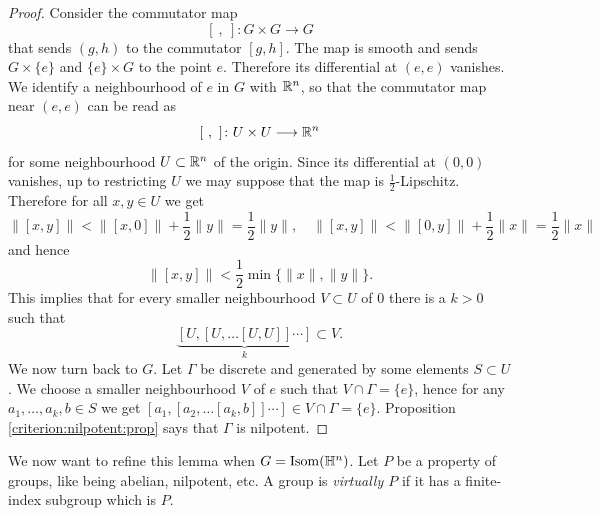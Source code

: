 \begin{proof}
Consider the commutator map 
$$[\ ,\ ]\colon G\times G \to G$$ 
that sends $(g,h)$ to the commutator $[g,h]$. The map is smooth and sends $G\times \{e\}$ and $\{e\}\times G$ to the point $e$. Therefore its differential at $(e,e)$ vanishes. We identify a neighbourhood of $e$ in $G$ with $\mathbb{R}^n$, so that the commutator map near $(e,e)$ can be read as 
$$[\ ,\ ]\colon U \times U \longrightarrow \mathbb{R}^n$$
for some neighbourhood $U\subset \mathbb{R}^n$ of the origin.
Since its differential at $(0,0)$ vanishes, up to restricting $U$ we may suppose that the map is $\frac 12$-Lipschitz. Therefore for all $x,y \in U$ we get
$$\|[x,y]\| < \|[x,0]\| + \frac 12\|y\| = \frac 12\|y\|, \quad \|[x,y]\| < \|[0,y]\| + \frac 12\|x\| = \frac 12\|x\|$$
and hence
$$\|[x,y]\| < \frac 12 \min \big\{\|x\|, \|y\|\big\}.$$
This implies that for every smaller neighbourhood $V\subset U$ of $0$ there is a $k>0$ such that
$$\underbrace{[U, [U, \ldots [U,U]]\cdots ]}_k \subset V.$$
We now turn back to $G$. Let $\Gamma$ be discrete and generated by some elements $S\subset U$. We choose a smaller neighbourhood $V$ of $e$ such that $V \cap \Gamma = \{e\}$, hence for any $a_1,\ldots, a_k,b\in S$ we get $[a_1,[a_2, \ldots[a_k,b]]\cdots ] \in V\cap\Gamma =\{e\}$. Proposition \ref{criterion:nilpotent:prop} says that $\Gamma$ is nilpotent.
\end{proof}

We now want to refine this lemma when $G={\rm Isom}(\mathbb{H}^n)$. Let $P$ be a property of groups, like being abelian, nilpotent, etc. A group is \emph{virtually $P$} if it has a finite-index subgroup which is $P$. 

